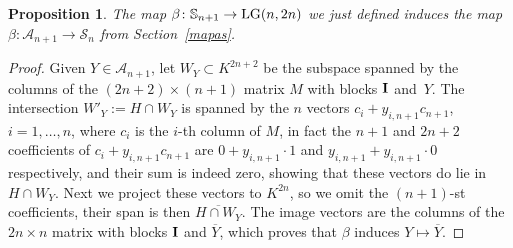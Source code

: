 \documentclass[10pt,a4paper]{amsart}
\newcommand{\bS}{{\mathbb S}}
\newcommand{\cA}{{\cal A}}
\newcommand{\cS}{{\cal S}}
\numberwithin{equation}{section}
\newtheorem{Proposition}[Theorem]{Proposition}
{ \theoremstyle{definition}
\newtheorem{Definition}[Theorem]{Definition}
\newtheorem{Example}[Theorem]{Example}
\newtheorem{Examples}[Theorem]{Examples}
\newtheorem{Remark}[Theorem]{Remark} }
\providecommand{\cal}{\mathcal}
\begin{document}
\begin{Proposition} \label{betas} The map $\beta\colon \bS_{n+1}\rightarrow {\rm LG}(n,2n)$ we just defined induces the map $\beta\colon \cA_{n+1}\rightarrow\cS_n$ from Section~{\rm \ref{mapas}}.
\end{Proposition}

\begin{proof}  Given $Y\in \cA_{n+1}$, let $W_Y\subset K^{2n+2}$ be the subspace spanned by the columns of the $(2n+2)\times(n+1)$ matrix $M$ with blocks ${\bf I}$ and~$Y$. The intersection $W'_Y:=H\cap W_Y$ is spanned by the $n$ vectors $c_i+y_{i,n+1}c_{n+1}$, $i=1,\ldots,n$, where $c_i$ is the $i$-th column of $M$, in fact the $n+1$ and $2n+2$ coefficients of $c_i+y_{i,n+1}c_{n+1}$ are $0+y_{i,n+1}\cdot1$ and $y_{i,n+1}+y_{i,n+1}\cdot 0$ respectively, and their sum is indeed zero, showing that these vectors do lie in $H\cap W_Y$. Next we project these vectors to $K^{2n}$, so we omit the $(n+1)$-st coefficients, their span is then $\overline{H\cap W_Y}$. The image vectors are the columns of the $2n\times n$ matrix with blocks ${\bf I}$ and $\overline{Y}$, which proves that $\beta$ induces $Y\mapsto\overline{Y}$.\end{proof}
\end{document}
